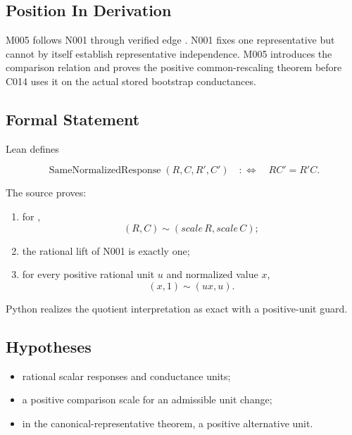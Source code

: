 \subsection{Position In Derivation}\label{position-in-derivation-9}

M005 follows N001 through verified edge \texttt{\protect{}}. N001 fixes one
representative but cannot by itself establish representative
independence. M005 introduces the comparison relation and proves the
positive common-rescaling theorem before C014 uses it on the actual
stored bootstrap conductances.

\subsection{Formal Statement}\label{formal-statement-3}

Lean defines

\[
\operatorname{SameNormalizedResponse}(R,C,R',C')
\quad:\Longleftrightarrow\quad
RC'=R'C.
\]

The source proves:

\begin{enumerate}
\def\labelenumi{\arabic{enumi}.}
\tightlist
\item
  for \texttt{\protect{}}, \[
  (R,C)\sim(scale\,R,scale\,C);
  \]
\item
  the rational lift of N001 is exactly one;
\item
  for every positive rational unit \(u\) and normalized value \(x\), \[
  (x,1)\sim(ux,u).
  \]
\end{enumerate}

Python realizes the quotient interpretation as exact
\texttt{\protect{}} with a positive-unit
guard.

\subsection{Hypotheses}\label{hypotheses-3}

\begin{itemize}
\tightlist
\item
  rational scalar responses and conductance units;
\item
  a positive comparison scale for an admissible unit change;
\item
  in the canonical-representative theorem, a positive alternative unit.
\end{itemize}


